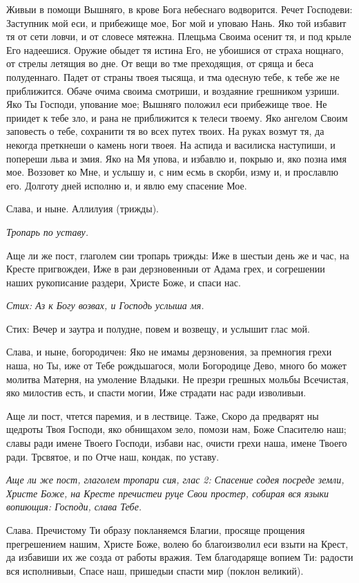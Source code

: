 Живыи в помощи Вышняго, в крове Бога небеснаго водворится. Речет Господеви: Заступник мой еси, и прибежище мое, Бог мой и уповаю Нань. Яко той избавит тя от сети ловчи, и от словесе мятежна. Плещьма Своима осенит тя, и под крыле Его надеешися. Оружие обыдет тя истина Его, не убоишися от страха нощнаго, от стрелы летящия во дне. От вещи во тме преходящия, от сряща и беса полуденнаго. Падет от страны твоея тысяща, и тма одесную тебе, к тебе же не приближится. Обаче очима своима смотриши, и воздаяние грешником узриши. Яко Ты Господи, упование мое; Вышняго положил еси прибежище твое. Не приидет к тебе зло, и рана не приближится к телеси твоему. Яко ангелом Своим заповесть о тебе, сохранити тя во всех путех твоих. На руках возмут тя, да некогда преткнеши о камень ноги твоея. На аспида и василиска наступиши, и попереши льва и змия. Яко на Мя упова, и избавлю и, покрыю и, яко позна имя мое. Воззовет ко Мне, и услышу и, с ним есмь в скорби, изму и, и прославлю его. Долготу дней исполню и, и явлю ему спасение Мое. 

Слава, и ныне. Аллилуия (трижды).


\itshape Тропарь по уставу.\normalfont{} 

Аще ли же пост, глаголем сии тропарь трижды: Иже в шестыи день же и час, на Кресте пригвождеи, Иже в раи дерзновенныи от Адама грех, и согрешении наших рукописание раздери, Христе Боже, и спаси нас.

\itshape Стих: \normalfont{}Аз к Богу возвах, и Господь услыша мя.

Стих: Вечер и заутра и полудне, повем и возвещу, и услышит глас мой.

Слава, и ныне, богородичен: Яко не имамы дерзновения, за премногия грехи наша, но Ты, иже от Тебе рождьшагося, моли Богородице Дево, много бо может молитва Матерня, на умоление Владыки. Не презри грешных мольбы Всечистая, яко милостив есть, и спасти могии, Иже страдати нас ради изволивыи. 

Аще ли пост, чтется паремия, и в лествице. Таже, Скоро да предварят ны щедроты Твоя Господи, яко обнищахом зело, помози нам, Боже Спасителю наш; славы ради имене Твоего Господи, избави нас, очисти грехи наша, имене Твоего ради. Трсвятое, и по Отче наш, кондак, по уставу. 

\itshape Аще ли же пост, глаголем тропари сия, глас 2: \normalfont{}Спасение содея посреде земли, Христе Боже, на Кресте пречистеи руце Свои простер, собирая вся языки вопиющия: Господи, слава Тебе. 

Слава. Пречистому Ти образу покланяемся Благии, просяще прощения прегрешением нашим, Христе Боже, волею бо благоизволил еси взыти на Крест, да избавиши их же созда от работы вражия. Тем благодаряще вопием Ти: радости вся исполнивыи, Спасе наш, пришедыи спасти мир (поклон великий). 

